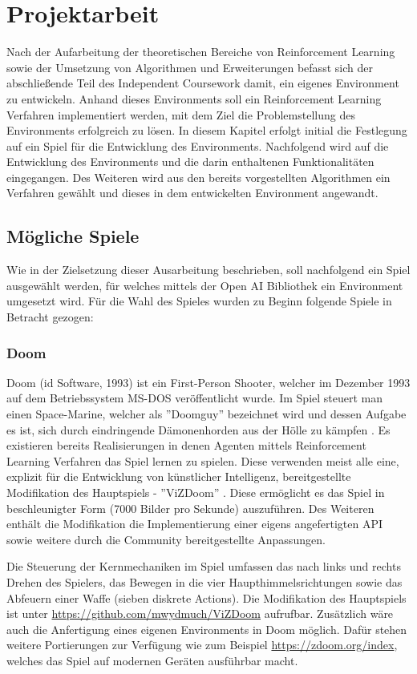 \documentclass[11pt]{scrartcl}
\begin{document}
\newpage
\section{Projektarbeit}
Nach der Aufarbeitung der theoretischen Bereiche von Reinforcement Learning sowie der Umsetzung von
Algorithmen und Erweiterungen befasst sich der abschließende Teil des Independent Coursework damit,
ein eigenes Environment zu entwickeln. Anhand dieses Environments soll ein Reinforcement Learning
Verfahren implementiert werden, mit dem Ziel die Problemstellung des Environments erfolgreich zu 
lösen. In diesem Kapitel erfolgt initial die Festlegung auf ein Spiel für die Entwicklung des
Environments. Nachfolgend wird auf die Entwicklung des Environments und die darin enthaltenen
Funktionalitäten eingegangen. Des Weiteren wird aus den bereits vorgestellten Algorithmen ein
Verfahren gewählt und dieses in dem entwickelten Environment angewandt. 

\subsection{Mögliche Spiele}
Wie in der Zielsetzung dieser Ausarbeitung beschrieben, soll nachfolgend ein Spiel ausgewählt werden,
für welches mittels der Open AI Bibliothek ein Environment umgesetzt wird. Für die Wahl des Spieles
wurden zu Beginn folgende Spiele in Betracht gezogen:

\subsubsection{Doom}
Doom (id Software, 1993) ist ein First-Person Shooter, welcher im Dezember 1993 auf dem Betriebssystem
MS-DOS veröffentlicht wurde. Im Spiel steuert man einen Space-Marine, welcher als ''Doomguy'' bezeichnet
wird und dessen Aufgabe es ist, sich durch eindringende Dämonenhorden aus der Hölle zu kämpfen
\cite{D1993}. Es existieren bereits Realisierungen in denen Agenten mittels Reinforcement Learning
Verfahren das Spiel lernen zu spielen. Diese verwenden meist alle eine, explizit für die Entwicklung
von künstlicher Intelligenz, bereitgestellte Modifikation des Hauptspiels - ''ViZDoom'' \cite{ViZDoom}. 
Diese ermöglicht es das Spiel in beschleunigter Form (7000 Bilder pro Sekunde) auszuführen. Des
Weiteren enthält die Modifikation die Implementierung einer eigens angefertigten API sowie weitere
durch die Community bereitgestellte Anpassungen.

Die Steuerung der Kernmechaniken im Spiel umfassen das nach links und rechts Drehen des Spielers,
das Bewegen in die vier Haupthimmelsrichtungen sowie das Abfeuern einer Waffe (sieben diskrete
Actions). Die Modifikation des Hauptspiels ist unter \url{https://github.com/mwydmuch/ViZDoom}
aufrufbar. Zusätzlich wäre auch die Anfertigung eines eigenen Environments in Doom möglich. Dafür
stehen weitere Portierungen zur Verfügung wie zum Beispiel \url{https://zdoom.org/index}, welches
das Spiel auf modernen Geräten ausführbar macht. 
\end{document}
